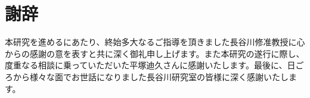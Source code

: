 ﻿%
\chapter*{謝辞}

本研究を進めるにあたり、終始多大なるご指導を頂きました長谷川修准教授に心からの感謝の意を表すと共に深く御礼申し上げます。また本研究の遂行に際し、度重なる相談に乗っていただいた平塚迪久さんに感謝いたします。最後に、日ごろから様々な面でお世話になりました長谷川研究室の皆様に深く感謝いたします。
